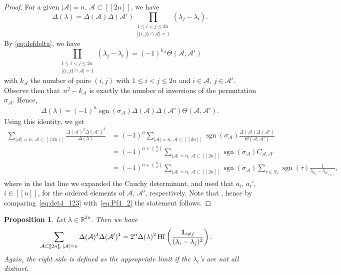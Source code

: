 \documentclass[pdftex]{sigma}
\numberwithin{equation}{section}
\newtheorem{Proposition}[Theorem]{Proposition}
\theoremstyle{definition}
\newcommand{\R}{{\mathbb R}}
\newcommand{\ind}{{\bf{1}}}
\newcommand{\sgn}{\operatorname{sgn}}
\newcommand{\Hf}{\operatorname{Hf}}
\newcommand{\cA}{\mathcal{A}}
\newcommand{\dd}{\Theta}
\newcommand{\lst}[1]{[\![#1 ]\!]}
\begin{document}
\begin{proof}
For a given $|\cA|=n$, $\cA\subset \lst{2n}$, we have
\[
\Delta(\lambda)=\Delta(\cA)\Delta(\cA') \prod_{\substack{1\le i<j\le 2n\\ \left|\{i,j\}\cap \cA\right|=1}} (\lambda_j-\lambda_i).
\]
By \eqref{eq:defdelta}, we have
\[
\prod_{\substack{1\le i<j\le 2n\\ \left|\{i,j\}\cap \cA\right|=1}} (\lambda_j-\lambda_i)=(-1)^{k_\cA}
\dd(\cA, \cA')
\]
 with $k_{\cA}$ the number of pairs $(i,j)$ with $1\le i<j\le 2n$ and $i\in \cA$, $j\in \cA'$. Observe then that~${n^2-k_{\cA}}$ is exactly the number of inversions of the permutation $\sigma_{\cA}$.
Hence,
 \begin{align}
 \label{eq:det_exp_A_Ac}
\Delta
(\lambda)=(-1)^n \sgn(\sigma_{\cA}) \Delta
(\cA)\Delta
(\cA') \dd(\cA, \cA').
\end{align}
Using this identity, we get
\begin{align}
 \sum_{|\cA|=n,\, \cA\subset\lst{2n}} \frac{\Delta
 (\cA)^2 \Delta
 (\cA')^2}{ \Delta(\lambda)}&=(-1)^n \sum_{|\cA|=n,\, \cA\subset\lst{2n}}
 \sgn(\sigma_{\cA})
 \frac{\Delta(\cA) \Delta(\cA')}{\dd(\cA, \cA')}\nonumber \\
 &=(-1)^{n+\binom{n}{2}}\sum_{|\cA|=n,\, \cA\subset\lst{2n}} \sgn(\sigma_{\cA}) C_{\cA, \cA'}
\nonumber
 \\
 &=(-1)^{n+\binom{n}{2}}\sum_{|\cA|=n,\, \cA\subset\lst{2n}} \sgn(\sigma_{\cA}) \sum_{\tau\in S_n} \sgn(\tau) \frac{1}{\lambda_{a_i}-\lambda_{a'_{\tau(i)}}}, \label{eq:det4_123}
\end{align}
where in the last line we expanded the Cauchy determinant, and used that $a_i$, $a_i'$, $i\in \lst{n}$, for the ordered elements of $\cA$, $\cA'$, respectively.
Note that \smash{$\sgn(\eta_n)=(-1)^{\binom{n}{2}}$}, hence by comparing~\eqref{eq:det4_123} with~\eqref{eq:Pf4_2} the statement follows.
\end{proof}

\begin{Proposition}\label{prop:det4+det2}
 Let ${\lambda}\in \R^{2n}$. Then we have
 \begin{align*}%
 \sum_{\cA\subset \lst{2n},\, |\cA|=n} \Delta (\cA)^4 \Delta (\cA')^4&=2^{n} \Delta(\lambda)^2
\Hf\left(\frac{\ind_{i\neq j}}{(\lambda_i-\lambda_j)^2}\right).
 \end{align*}
 Again, the right side is defined as the appropriate limit if the $\lambda_i$'s are not all distinct.
\end{Proposition}
\end{document}
